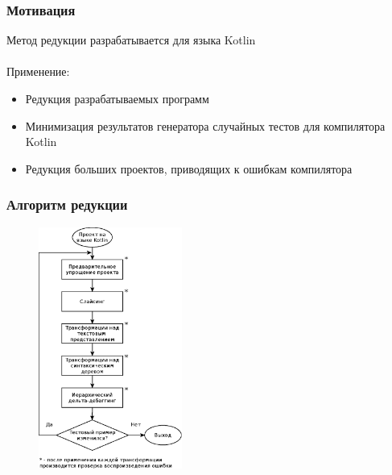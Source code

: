 
\begin{frame}
	\frametitle{Мотивация}
	Метод редукции разрабатывается для языка Kotlin \\ \ \\
	Применение:
	\begin{itemize}
		\item Редукция разрабатываемых программ
		\item Минимизация результатов генератора случайных тестов для компилятора Kotlin
		\item Редукция больших проектов, приводящих к ошибкам компилятора
	\end{itemize}
\end{frame}

\begin{frame}
	\frametitle{Алгоритм редукции}
	\begin{figure}
		\includegraphics[width=47mm]{image/new_algo}
	\end{figure}	
\end{frame}



